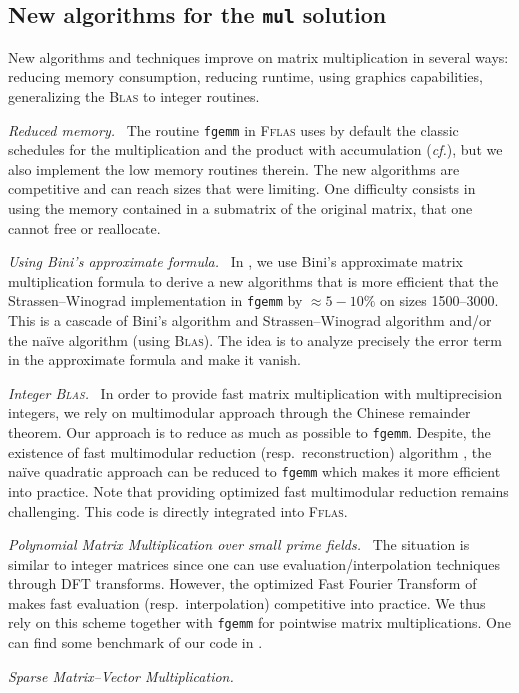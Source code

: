 \documentclass[a4paper]{article}
\def\scsf#1{{\scshape \biolinum #1}} %
\def\num#1{#1}
\newcommand\mul{\texttt{mul}\xspace}
\newcommand\fgemm{\texttt{fgemm}\xspace}
\newcommand\fflas{\scsf{Fflas}\xspace}
\newcommand{\cf}{\mbox{\emph{cf.}}\xspace}
\newcommand{\blas}{\scsf{Blas}\xspace}
\begin{document}
\subsection{New algorithms for the \mul solution}\label{ssec:algmul}
%
New algorithms and techniques improve on matrix multiplication
in several  ways: reducing memory consumption, reducing runtime,
using graphics capabilities, generalizing the \blas to integer
routines.
%
\def\monitem#1{\par \textit{#1}\ }
\monitem{Reduced memory.}
%
The routine \fgemm in \fflas uses by default the classic schedules for the multiplication
and the product with accumulation (\cf \cite{Boyer:2009:sched}), but we also
implement the low memory routines therein. The new algorithms are competitive
and can reach sizes that were limiting.
%
%
One difficulty consists in using the memory contained in a submatrix of
the original matrix, that one cannot free or reallocate.
%
\monitem{Using Bini's approximate formula.}
%
In \cite{BD:2014:Bini}, we use Bini's approximate matrix multiplication formula
to derive a new algorithms that is more efficient that the Strassen--Winograd
implementation in \fgemm by $\approx 5-10\%$ on sizes \num{1500}--\num{3000}.
This is a cascade of Bini's algorithm and Strassen--Winograd algorithm and/or
the naïve algorithm (using \blas). The idea is to analyze precisely the error
term in the approximate formula and make it vanish.
%
\monitem{Integer \blas.}
%
In order to provide fast matrix multiplication with multiprecision integers, we
rely on multimodular approach through the Chinese remainder theorem. Our
approach is to reduce as much as possible to \fgemm. Despite, the existence of
fast multimodular reduction (resp.\ reconstruction) algorithm
\cite{VonzurGathen:1999:MCA}, the naïve quadratic approach can be reduced to
\fgemm which makes it more efficient into practice.  Note that providing
optimized fast multimodular reduction remains challenging. This code is
directly integrated  into \fflas.
%
\monitem{Polynomial Matrix Multiplication over small prime fields.}
%
The situation is similar to integer matrices since one can use
evaluation/interpolation techniques through DFT transforms. However, the
optimized Fast Fourier Transform of \cite{Harvey:2014}  makes fast evaluation
(resp.\ interpolation) competitive into practice. We thus rely on this scheme
together with \fgemm for pointwise matrix multiplications. One can find some
benchmark of our code in \cite{GioLeb14}.
%
\monitem{Sparse Matrix--Vector Multiplication.}
\end{document}
